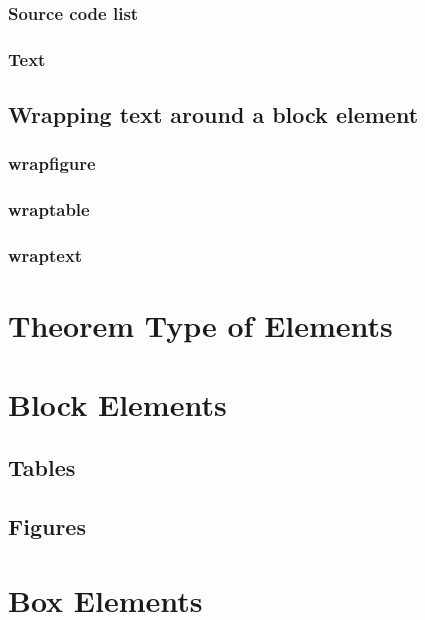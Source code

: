 \documentclass[11pt,dark=4508]{QIBook}
\begin{document}
\subsection{Source code list}
\lipsum[20-22]
\begin{multicols}{2}
    \lstset{numbers=left,
        numberstyle=\tiny,
        numbersep=5pt,
        numberfirstline=true,
        firstnumber=1}%
    \lstset{xleftmargin=2em}
    \tiny
\end{multicols}
\lipsum[23-25]
\subsection{Text}
\lipsum[1]
\begin{multicols}{3}
    \lipsum[1-10]
\end{multicols}
\lipsum[2-5]
\section{Wrapping text around a block element}
\subsection{wrapfigure}
\subsection{wraptable}
\subsection{wraptext}

\chapter{Theorem Type of Elements}

\chapter{Block Elements}
\section{Tables}
\section{Figures}

\chapter{Box Elements}
\end{document}

